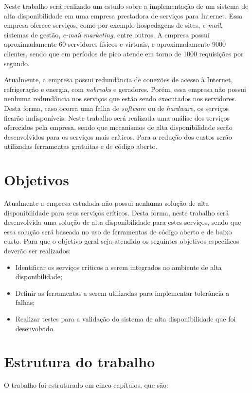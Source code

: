 Neste trabalho será realizado um estudo sobre a implementação de um sistema de alta disponibilidade em uma empresa prestadora de serviços para 
Internet. Essa empresa oferece serviços, como por exemplo hospedagens de sites, \textit{e-mail}, sistemas de gestão, \textit{e-mail marketing}, 
entre outros. A empresa possui aproximadamente 60 servidores físicos e virtuais, e aproximadamente 9000 clientes, 
sendo que em períodos de pico atende em torno de 1000 requisições por segundo. 

Atualmente, a empresa possui redundância de conexões de acesso à Internet, refrigeração e energia, com \textit{nobreaks} e geradores. 
Porém, essa empresa não possui nenhuma redundância nos serviços que estão sendo executados nos servidores. Desta forma, caso ocorra 
uma falha de \textit{software} ou de \textit{hardware}, os serviços ficarão indisponíveis. Neste trabalho será realizada uma análise dos 
serviços oferecidos pela empresa, sendo que mecanismos de alta disponibilidade serão desenvolvidos para os serviços mais críticos. 
Para a redução dos custos serão utilizadas ferramentas gratuitas e de código aberto.

\section{Objetivos}
Atualmente a empresa estudada não possui nenhuma solução de alta disponibilidade para seus serviços críticos. Desta forma, neste trabalho 
será desenvolvida uma solução de alta disponibilidade para estes serviços, sendo que essa solução será baseada no uso de ferramentas de 
código aberto e de baixo custo. Para que o objetivo geral seja atendido os seguintes objetivos específicos deverão ser realizados:

\begin{itemize}
\item Identificar os serviços críticos a serem integrados ao ambiente de alta disponibilidade;
\item Definir as ferramentas a serem utilizadas para implementar tolerância a falhas;
\item Realizar testes para a validação do sistema de alta disponibilidade que foi desenvolvido.
\end{itemize}

\section{Estrutura do trabalho}
O trabalho foi estruturado em cinco capítulos, que são:

